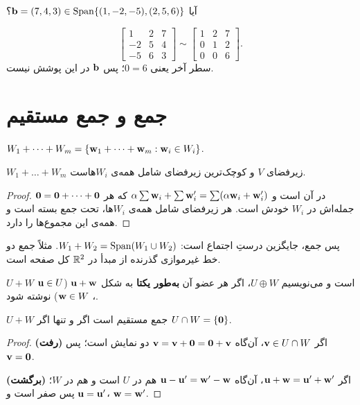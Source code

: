 \begin{example}
آیا $\mathbf{b}=(7,4,3)\in\operatorname{Span}\{(1,-2,-5),(2,5,6)\}$؟
\end{example}
\begin{solution}
\[
\left[\begin{array}{cc|c}1&2&7\\-2&5&4\\-5&6&3\end{array}\right]
\sim
\left[\begin{array}{cc|c}1&2&7\\0&1&2\\0&0&6\end{array}\right].
\]
سطر آخر یعنی $0=6$؛ پس $\mathbf{b}$ در این پوشش نیست.
\end{solution}

\section{جمع و جمع مستقیم}

\begin{definition}
$W_1+\dots+W_m=\{\mathbf{w}_1+\dots+\mathbf{w}_m: \mathbf{w}_i\in W_i\}$.
\end{definition}

\begin{theorem}\label{thm:sum-subspace}
$W_1+\dots+W_m$ زیرفضای $V$ و کوچک‌ترین زیرفضای شامل همه‌ی $W_i$هاست.
\end{theorem}
\begin{proof}
$\mathbf{0}=\mathbf{0}+\dots+\mathbf{0}$ در آن است و
$\alpha\sum\mathbf{w}_i+\sum\mathbf{w}_i'=\sum(\alpha\mathbf{w}_i+\mathbf{w}_i')$
که هر جمله‌اش در $W_i$ خودش است. هر زیرفضای شامل همه‌ی $W_i$ها، تحت جمع بسته است و همه‌ی این مجموع‌ها را دارد.
\end{proof}

پس جمع، جایگزین درستِ اجتماع است: $W_1+W_2=\operatorname{Span}(W_1\cup W_2)$. مثلاً جمع دو خط غیرموازی گذرنده از مبدأ در $\mathbb{R}^2$ کل صفحه است.

\begin{definition}
$U+W$  است و می‌نویسیم $U\oplus W$، اگر هر عضو آن \textbf{به‌طور یکتا} به شکل $\mathbf{u}+\mathbf{w}$ ($\mathbf{u}\in U$، $\mathbf{w}\in W$) نوشته شود.
\end{definition}

\begin{theorem}\label{thm:direct-sum}
$U+W$ جمع مستقیم است اگر و تنها اگر $U\cap W=\{\mathbf{0}\}$.
\end{theorem}
\begin{proof}
\textbf{(رفت)} اگر $\mathbf{v}\in U\cap W$، آن‌گاه $\mathbf{v}=\mathbf{v}+\mathbf{0}=\mathbf{0}+\mathbf{v}$ دو نمایش است؛ پس $\mathbf{v}=\mathbf{0}$.

\textbf{(برگشت)} اگر $\mathbf{u}+\mathbf{w}=\mathbf{u}'+\mathbf{w}'$، آن‌گاه $\mathbf{u}-\mathbf{u}'=\mathbf{w}'-\mathbf{w}$ هم در $U$ است و هم در $W$؛ پس صفر است و $\mathbf{u}=\mathbf{u}'$، $\mathbf{w}=\mathbf{w}'$.
\end{proof}

